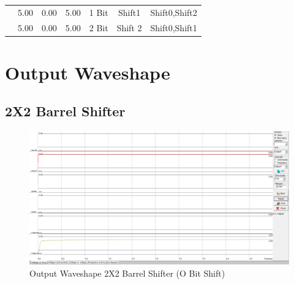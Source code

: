 \documentclass[a4paper,12pt]{article}
\begin{document}
\begin{table}[H]
{\begin{tabular}{|c|c|c|l|c|c|c|}
	& 5.00                                                          & 0.00                                                          & 5.00                                                                               & 1 Bit             & Shift1                                                                         & Shift0,Shift2                                                                 \\ \cline{2-7} 
	& \multicolumn{1}{l|}{5.00}                                     & \multicolumn{1}{l|}{0.00}                                     & 5.00                                                                               & 2 Bit             & Shift 2                                                                        & Shift0,Shift1                                                                 \\ \hline
	\end{tabular}}
\end{table}


	\newpage
	\section{Output Waveshape }
	\subsection{2X2 Barrel Shifter}
		\begin{figure}[H]
		\centering
		\includegraphics[width=1\linewidth, height=.4\textheight]{Images/2bs0}
		\caption{Output Waveshape 2X2 Barrel Shifter (O Bit Shift)}
		\label{fig:2b}
	\end{figure}
	
\end{document}
